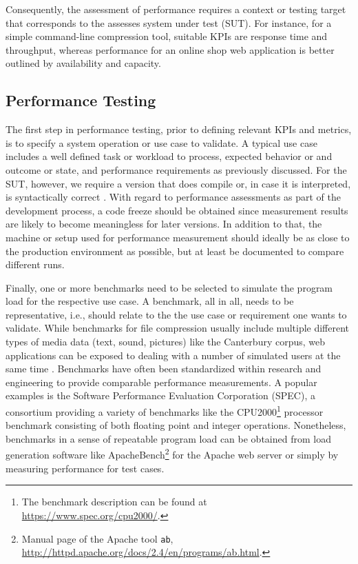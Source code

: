 Consequently, the assessment of performance requires a context or testing
target that corresponds to the assesses system under test (SUT). For instance,
for a simple command-line compression tool, suitable KPIs are response time and
throughput, whereas performance for an online shop web application is better
outlined by availability and capacity.

\subsection{Performance Testing}
The first step in performance testing, prior to defining relevant KPIs and
metrics, is to specify a system operation or use case \citep{woodside_future_2007} to
validate. A typical use case includes a well defined task or workload to
process, expected behavior or and outcome or state, and performance
requirements as previously discussed. For the SUT, however, we require a
version that does compile or, in case it is interpreted, is syntactically
correct \citep{molyneaux_art_2014}. With regard to performance assessments as part of
the development process, a code freeze should be obtained since measurement
results are likely to become meaningless for later versions. In addition to
that,  the machine or setup used for performance measurement should ideally be
as close to the production environment as possible, but at least be documented
to compare different runs.

Finally, one or more benchmarks need to be selected to simulate  the program
load for the respective use case. A benchmark, all in all, needs to be
representative, i.e., should relate to the the use case or requirement one
 wants to validate. While benchmarks for file compression usually include
multiple different types of media data (text, sound, pictures) like the
Canterbury corpus, web applications can be exposed to dealing with a number of
simulated users at the same time \citep{molyneaux_art_2014}. Benchmarks have often been
standardized within research and engineering to provide comparable performance
measurements. A popular examples is the Software Performance Evaluation
Corporation (SPEC), a consortium providing a variety of benchmarks like the
CPU2000\footnote{The benchmark description
can be found at \url{https://www.spec.org/cpu2000/}.} processor benchmark
consisting of both floating point and integer operations. Nonetheless, benchmarks in a sense of repeatable program load can be obtained from load generation software like
ApacheBench\footnote{Manual
page of the Apache
tool \texttt{ab}, \url{http://httpd.apache.org/docs/2.4/en/programs/ab.html}.}
for the Apache web server or simply by measuring performance for test cases.

